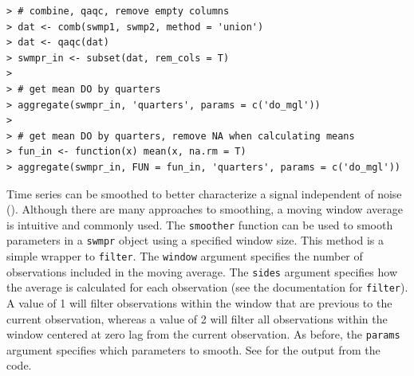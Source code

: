 \documentclass[10pt,letterpaper]{article}\usepackage[]{graphicx}\usepackage[]{color}
\makeatletter
\newenvironment{kframe}{%
 \def\at@end@of@kframe{}%
 \ifinner\ifhmode%
  \def\at@end@of@kframe{\end{minipage}}%
  \begin{minipage}{\columnwidth}%
 \fi\fi%
 \def\FrameCommand##1{\hskip\@totalleftmargin \hskip-\fboxsep
 \colorbox{shadecolor}{##1}\hskip-\fboxsep
     \hskip-\linewidth \hskip-\@totalleftmargin \hskip\columnwidth}%
 \MakeFramed {\advance\hsize-\width
   \@totalleftmargin\z@ \linewidth\hsize
   \@setminipage}}%
 {\par\unskip\endMakeFramed%
 \at@end@of@kframe}
\newenvironment{knitrout}{}{} %
\makeatother
\begin{document}
\begin{knitrout}
\color{fgcolor}\begin{kframe}
\begin{verbatim}
> # combine, qaqc, remove empty columns
> dat <- comb(swmp1, swmp2, method = 'union')
> dat <- qaqc(dat)
> swmpr_in <- subset(dat, rem_cols = T)
> 
> # get mean DO by quarters
> aggregate(swmpr_in, 'quarters', params = c('do_mgl'))
> 
> # get mean DO by quarters, remove NA when calculating means
> fun_in <- function(x) mean(x, na.rm = T)
> aggregate(swmpr_in, FUN = fun_in, 'quarters', params = c('do_mgl'))
\end{verbatim}
\end{kframe}
\end{knitrout}

Time series can be smoothed to better characterize a signal independent of noise ().  Although there are many approaches to smoothing, a moving window average is intuitive and commonly used.  The \texttt{smoother} function can be used to smooth parameters in a \texttt{swmpr} object using a specified window size.  This method is a simple wrapper to \texttt{filter}.  The \texttt{window} argument specifies the number of observations included in the moving average.  The \texttt{sides} argument specifies how the average is calculated for each observation (see the documentation for \texttt{filter}).  A value of 1 will filter observations within the window that are previous to the current observation, whereas a value of 2 will filter all observations within the window centered at zero lag from the current observation. As before, the \texttt{params} argument specifies which parameters to smooth.  See  for the output from the code.
\end{document}
